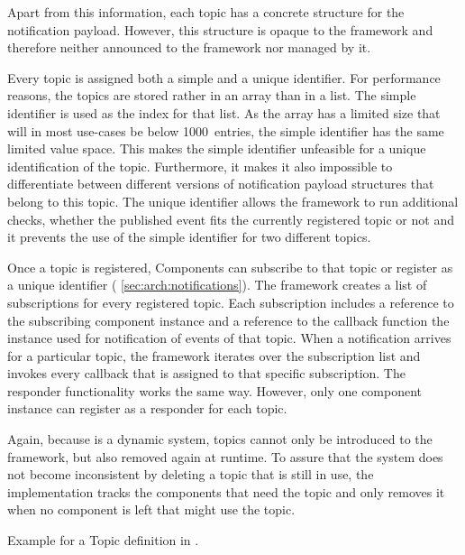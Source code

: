 Apart from this information, each topic has a concrete structure for the notification payload. However, this structure is opaque to the \cobas{} framework and therefore neither announced to the framework nor managed by it.

Every topic is assigned both a simple and a unique identifier. For performance reasons, the topics are stored rather in an array than in a list. The simple identifier is used as the index for that list. As the array has a limited size that will in most use-cases be below 1000~entries, the simple identifier has the same limited value space. This makes the simple identifier unfeasible for a unique identification of the topic. Furthermore, it makes it also impossible to differentiate between different versions of notification payload structures that belong to this topic. The unique identifier allows the framework to run additional checks, whether the published event fits the currently registered topic or not and it prevents the use of the simple identifier for two different topics.

Once a topic is registered, Components can subscribe to that topic or register as a unique identifier (\cf{} \cref{sec:arch:notifications}). The framework creates a list of subscriptions for every registered topic. Each subscription includes a reference to the subscribing component instance and a reference to the callback function the instance used for notification of events of that topic. When a notification arrives for a particular topic, the framework iterates over the subscription list and invokes every callback that is assigned to that specific subscription. The responder functionality works the same way. However, only one component instance can register as a responder for each topic.

Again, because \cobas{} is a dynamic system, topics cannot only be introduced to the framework, but also removed again at runtime. To assure that the system does not become inconsistent by deleting a topic that is still in use, the implementation tracks the components that need the topic and only removes it when no component is left that might use the topic.

\begin{listing}[t!]\centering
	\begin{minipage}{.85\textwidth}
		\captionsetup{margin=20pt}
		\caption{Example for a Topic definition in \cobas{}.}
		\label{lst:cobas:affinity}\vspace{-2mm}
		\inputminted[fontsize=\footnotesize]{C}{listings/affinity.h}
	\end{minipage}
\end{listing}

